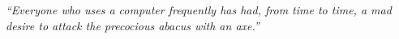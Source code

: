 \documentclass[oneside,11pt]{Classes/myThesis}
\title{\myTitle}
\author{\href{mailto:\authorEmail}{\theAuthor}}
\begin{document}

\maketitle
\setcounter{secnumdepth}{4}
\setcounter{tocdepth}{4}
\frontmatter

% 

\clearpage

\begin{dedication}
\begin{center}
\parbox{0.64\textwidth}{
\raggedright{
\emph{
``Everyone who uses a computer frequently has had, from time to time, a mad desire to attack the precocious abacus with an axe.''
}
\par
}
}
\vfill
\end{center}
\end{dedication}

\end{document}
